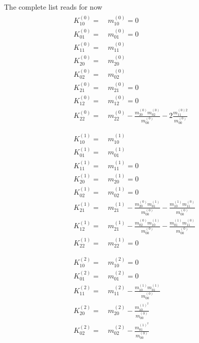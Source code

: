 The complete list reads for now
\begin{align}
  \label{eq: expansions of cumulants zeroth order}
  &\begin{aligned}
    K_{10}^{(0)} =&\ m_{10}^{(0)}=0\\
    K_{01}^{(0)} =&\ m_{01}^{(0)}=0\\
    K_{11}^{(0)} =&\ m_{11}^{(0)}\\
    K_{20}^{(0)} =&\ m_{20}^{(0)}\\
    K_{02}^{(0)} =&\ m_{02}^{(0)}\\
    K_{21}^{(0)} =&\ m_{21}^{(0)}=0\\
    K_{12}^{(0)} =&\ m_{12}^{(0)}=0\\
    K_{22}^{(0)} =&\ m_{22}^{(0)} - \frac{ m_{20}^{(0)} m_{02}^{(0)} }{m_{00}^{(0)}} - 2\frac{ m_{11}^{(0)2}}{m_{00}^{(0)}}
  \end{aligned}
  \\\nonumber&\\&
  \label{eq: expansions of cumulants first order}
  \begin{aligned}
    K_{10}^{(1)} =&\ m_{10}^{(1)}\\
    K_{01}^{(1)} =&\ m_{01}^{(1)}\\
    K_{11}^{(1)} =&\ m_{11}^{(1)} = 0 \\
    K_{20}^{(1)} =&\ m_{20}^{(1)} = 0\\
    K_{02}^{(1)} =&\ m_{02}^{(1)} = 0\\
    K_{21}^{(1)} =&\ m_{21}^{(1)}
    - \frac{m_{20}^{(0)} m_{01}^{(1)}}{m_{00}^{(0)}}
    - \frac{m_{10}^{(1)} m_{11}^{(0)}}{m_{00}^{(0)}} \\
    K_{12}^{(1)} =&\ m_{21}^{(1)}
    - \frac{m_{02}^{(0)} m_{10}^{(1)}}{m_{00}^{(0)}}
    - \frac{m_{01}^{(1)} m_{11}^{(0)}}{m_{00}^{(0)}} \\
    K_{22}^{(1)} =&\ m_{22}^{(1)} = 0
  \end{aligned}
\\\nonumber&\\&
  \label{eq: expansions of cumulants second order}
  \begin{aligned}
    K_{10}^{(2)} =&\ m_{10}^{(2)} = 0\\
    K_{01}^{(2)} =&\ m_{01}^{(2)} = 0\\
    K_{11}^{(2)} =&\ m_{11}^{(2)} - \frac{ m_{10}^{(1)}m_{01}^{(1)}}{m_{00}^{(0)}} \\
    K_{20}^{(2)} =&\ m_{20}^{(2)} - \frac{ m_{10}^{{(1)}^2}}{m_{00}^{(0)}} \\
    K_{02}^{(2)} =&\ m_{02}^{(2)} - \frac{ m_{01}^{{(1)}^2}}{m_{00}^{(0)}} \\

\end{aligned}
\end{align}
